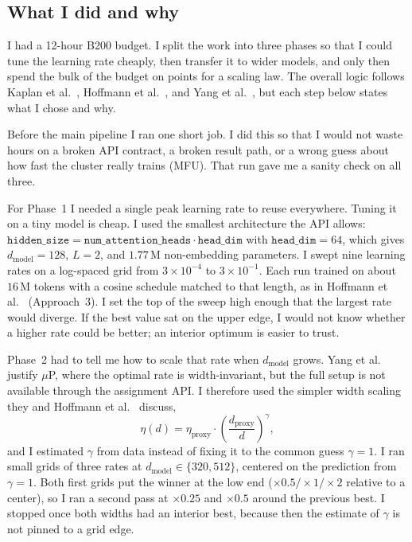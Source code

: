 \documentclass[11pt]{article}
\begin{document}
\subsection{What I did and why}

I had a 12-hour B200 budget. I split the work into three phases so that I could tune the learning rate cheaply, then transfer it to wider models, and only then spend the bulk of the budget on points for a scaling law. The overall logic follows Kaplan et al.~\cite{kaplan2020}, Hoffmann et al.~\cite{hoffmann2022}, and Yang et al.~\cite{yang2022}, but each step below states what I chose and why.

Before the main pipeline I ran one short job. I did this so that I would not waste hours on a broken API contract, a broken result path, or a wrong guess about how fast the cluster really trains (MFU). That run gave me a sanity check on all three.

For Phase~1 I needed a single peak learning rate to reuse everywhere. Tuning it on a tiny model is cheap. I used the smallest architecture the API allows: $\texttt{hidden\_size} = \texttt{num\_attention\_heads} \cdot \texttt{head\_dim}$ with $\texttt{head\_dim} = 64$, which gives $d_\text{model} = 128$, $L = 2$, and $1.77\,\text{M}$ non-embedding parameters. I swept nine learning rates on a log-spaced grid from $3 \times 10^{-4}$ to $3 \times 10^{-1}$. Each run trained on about $16\,\text{M}$ tokens with a cosine schedule matched to that length, as in Hoffmann et al.~\cite{hoffmann2022} (Approach~3). I set the top of the sweep high enough that the largest rate would diverge. If the best value sat on the upper edge, I would not know whether a higher rate could be better; an interior optimum is easier to trust.

Phase~2 had to tell me how to scale that rate when $d_\text{model}$ grows. Yang et al.~\cite{yang2022} justify $\mu$P, where the optimal rate is width-invariant, but the full setup is not available through the assignment API. I therefore used the simpler width scaling they and Hoffmann et al.~\cite{hoffmann2022} discuss,
\begin{equation}
    \eta(d) = \eta_\text{proxy} \cdot \left( \frac{d_\text{proxy}}{d} \right)^{\!\gamma},
\end{equation}
and I estimated $\gamma$ from data instead of fixing it to the common guess $\gamma = 1$. I ran small grids of three rates at $d_\text{model} \in \{320, 512\}$, centered on the prediction from $\gamma = 1$. Both first grids put the winner at the low end ($\times 0.5/\times 1/\times 2$ relative to a center), so I ran a second pass at $\times 0.25$ and $\times 0.5$ around the previous best. I stopped once both widths had an interior best, because then the estimate of $\gamma$ is not pinned to a grid edge.
\end{document}
